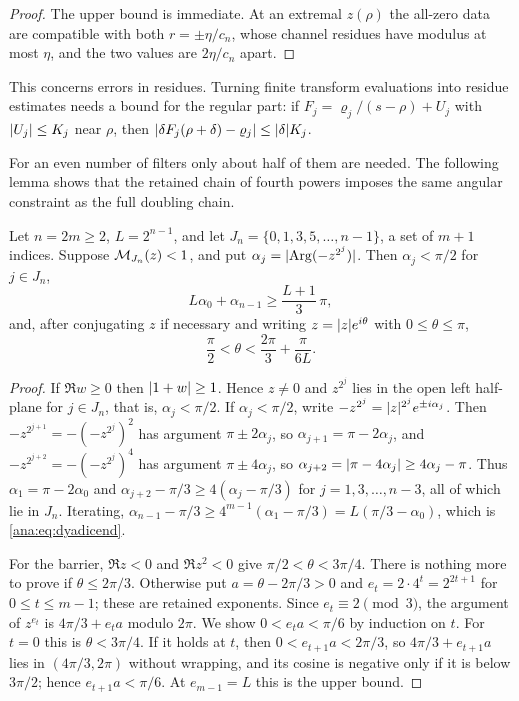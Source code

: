 \begin{proof}
The upper bound is immediate. At an extremal $z(\rho)$ the all-zero data are compatible with
both $r=\pm\eta/c_n$, whose channel residues have modulus at most $\eta$, and the two values
are $2\eta/c_n$ apart.
\end{proof}

This concerns errors in residues. Turning finite transform evaluations into residue estimates
needs a bound for the regular part: if $F_j=\varrho_j/(s-\rho)+U_j$ with $\lvert U_j\rvert\le K_j$
near $\rho$, then $\lvert\delta F_j(\rho+\delta)-\varrho_j\rvert\le\lvert\delta\rvert K_j$.

For an even number of filters only about half of them are needed. The following lemma shows
that the retained chain of fourth powers imposes the same angular constraint as the full
doubling chain.

\begin{lemma}\label{ana:lem:dyadicbarrier}
Let $n=2m\ge2$, $L=2^{n-1}$, and let $J_n=\{0,1,3,5,\dots,n-1\}$, a set of $m+1$ indices.
Suppose $\mathcal{M}_{J_n}(z)<1$, and put $\alpha_j=\lvert\operatorname{Arg}(-z^{2^j})\rvert$. Then
$\alpha_j<\pi/2$ for $j\in J_n$,
\begin{equation}\label{ana:eq:dyadicend}
 L\alpha_0+\alpha_{n-1}\ge\frac{L+1}3\,\pi,
\end{equation}
and, after conjugating $z$ if necessary and writing $z=\lvert z\rvert e^{i\theta}$ with
$0\le\theta\le\pi$,
\[
 \frac\pi2<\theta<\frac{2\pi}3+\frac\pi{6L}.
\]
\end{lemma}

\begin{proof}
If $\Re w\ge0$ then $\lvert1+w\rvert\ge1$. Hence $z\ne0$ and $z^{2^j}$ lies in the open left
half-plane for $j\in J_n$, that is, $\alpha_j<\pi/2$. If $\alpha_j<\pi/2$, write
$-z^{2^j}=\lvert z\rvert^{2^j}e^{\pm i\alpha_j}$. Then $-z^{2^{j+1}}=-(-z^{2^j})^2$ has argument
$\pi\pm2\alpha_j$, so $\alpha_{j+1}=\pi-2\alpha_j$, and $-z^{2^{j+2}}=-(-z^{2^j})^4$ has
argument $\pi\pm4\alpha_j$, so $\alpha_{j+2}=\lvert\pi-4\alpha_j\rvert\ge4\alpha_j-\pi$. Thus
$\alpha_1=\pi-2\alpha_0$ and $\alpha_{j+2}-\pi/3\ge4(\alpha_j-\pi/3)$ for $j=1,3,\dots,n-3$,
all of which lie in $J_n$. Iterating,
$\alpha_{n-1}-\pi/3\ge4^{m-1}(\alpha_1-\pi/3)=L(\pi/3-\alpha_0)$, which is
\eqref{ana:eq:dyadicend}.

For the barrier, $\Re z<0$ and $\Re z^2<0$ give $\pi/2<\theta<3\pi/4$. There is nothing more
to prove if $\theta\le2\pi/3$. Otherwise put $a=\theta-2\pi/3>0$ and $e_t=2\cdot4^t=2^{2t+1}$
for $0\le t\le m-1$; these are retained exponents. Since $e_t\equiv2\pmod3$, the argument of
$z^{e_t}$ is $4\pi/3+e_ta$ modulo $2\pi$. We show $0<e_ta<\pi/6$ by induction on $t$. For
$t=0$ this is $\theta<3\pi/4$. If it holds at $t$, then $0<e_{t+1}a<2\pi/3$, so
$4\pi/3+e_{t+1}a$ lies in $(4\pi/3,2\pi)$ without wrapping, and its cosine is negative only
if it is below $3\pi/2$; hence $e_{t+1}a<\pi/6$. At $e_{m-1}=L$ this is the upper bound.
\end{proof}

